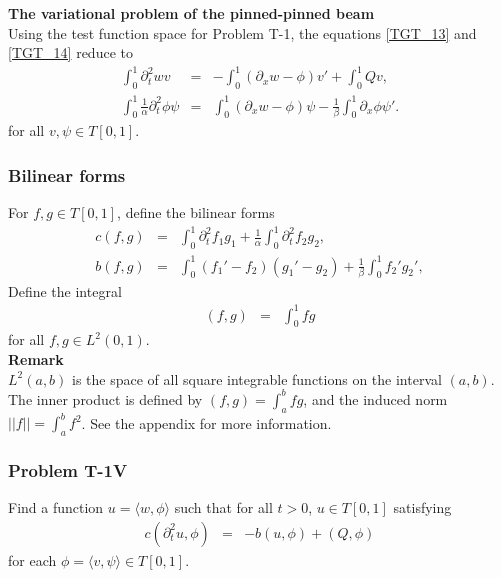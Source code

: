 \documentclass[../../main.tex]{subfiles}
\begin{document}
\textbf{The variational problem of the pinned-pinned beam}\\

Using the test function space for Problem T-1, the equations \eqref{TGT_13} and \eqref{TGT_14} reduce to
\begin{eqnarray}
	\int_{0}^{1} \partial_{t}^{2} w v &=& -\int_{0}^{1}(\partial_x w - \phi) v' + \int_{0}^{1} Q v, \label{eq:1D_Model:ProblemT1V1}\\
	\int_{0}^{1}\frac{1}{\alpha} \partial_{t}^{2} \phi \psi &=&   \int_{0}^{1} (\partial_x w -\phi) \psi - \frac{1}{\beta} \int_{0}^{1}\partial_x \phi \psi'.\label{eq:1D_Model:ProblemT1V2}
\end{eqnarray}
for all $v, \psi \in T[0,1]$.

\subsubsection{Bilinear forms}
For $f,g \in T[0,1]$, define the bilinear forms
\begin{eqnarray}
	c(f,g) & = & \int_0^1  \partial_t^2 f_1 g_1 + \frac{1}{\alpha}\int_0^1  \partial_t^2 f_2g_2, \label{eq:1D_Model:Bilinear} \\ 
	b(f,g) & = &   \int_0^1 (f_1'-f_2)(g_1' - g_2) + \frac{1}{\beta}\int_0^1  f_2' g_2', \label{eq:1D_Model:Bilinear_c}
\end{eqnarray}
Define the integral
\begin{eqnarray}
	(f,g) &=& \int_{0}^1 fg \label{eq:1D_Model:Bilinear_int}
\end{eqnarray} for all $f,g \in L^2(0,1).$\\

\textbf{Remark}\\
$L^2(a,b)$ is the space of all square integrable functions on the interval $(a,b)$. The inner product is defined by $\displaystyle (f,g) = \int_a^b fg$, and the induced norm $\displaystyle ||f|| = \int_a^b f^2$. See the appendix for more information.\\

\subsubsection*{Problem T-1V}\label{sssec:1D_Model:ProblemT1V}
Find a function ${u} = \langle w, \phi \rangle$ such that for all $t >0$, ${u} \in  T[0,1]$ satisfying
\begin{eqnarray}
	c(\partial_t^2 u,{\phi}) &=& -b({u},{\phi}) + (Q,{\phi})
\end{eqnarray} for each ${\phi} = \langle v, \psi \rangle \in T[0,1]$. \\
\end{document}
